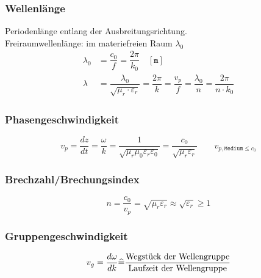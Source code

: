 \subsubsection{Wellenlänge}
Periodenlänge entlang der Ausbreitungsrichtung.\\
Freiraumwellenlänge: im materiefreien Raum $ \lambda_0 $
\begin{align*}
	\lambda_0 & = \dfrac{c_0}{f} = \dfrac{2\pi}{k_0} \quad [\texttt{m}]\\
	\lambda   & = \dfrac{\lambda_0}{\sqrt{\mu_r \cdot \varepsilon_r}} = \dfrac{2 \pi}{k} = \dfrac{v_p}{f} = \dfrac{\lambda_0}{n} = \dfrac{2 \pi}{n \cdot k_0}
\end{align*}

\subsubsection{Phasengeschwindigkeit}
\[
v_p = \dfrac{d z}{d t} = \dfrac{\omega}{k} = \frac{1}{\sqrt{ \mu_r \mu_0 \varepsilon_r \varepsilon_0} } = \frac{c_0}{\sqrt{\mu_r \varepsilon_r}} \qquad v_{p,\texttt{Medium} \leq c_0}
\]

\subsubsection{Brechzahl/Brechungsindex}
\[ 
n = \frac{c_0}{v_p} = \sqrt{\mu_r \varepsilon_r} \approx \sqrt{\varepsilon_r} \geq 1
 \]
\subsubsection{Gruppengeschwindigkeit}
\[
v_g = \dfrac{d \omega}{d k} \widehat{=} \dfrac{\textnormal{Wegstück der Wellengruppe}}{\textnormal{Laufzeit der Wellengruppe}}
\]

